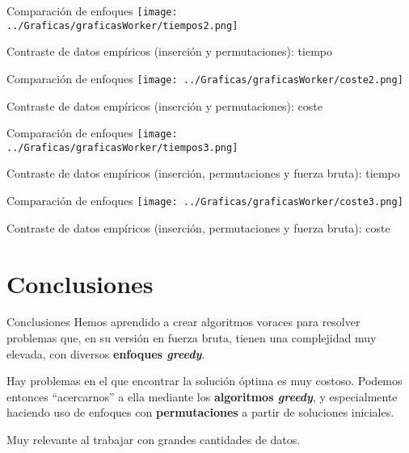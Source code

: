 \documentclass[10pt, xcolor=table]{beamer}
\begin{document}
\begin{frame}[fragile]{Comparación de enfoques}
\texttt{[image: ../Graficas/graficasWorker/tiempos2.png]}
\begin{center}
	\footnotesize{Contraste de datos empíricos (inserción y permutaciones): tiempo}
\end{center}
\end{frame}


\begin{frame}[fragile]{Comparación de enfoques}
\texttt{[image: ../Graficas/graficasWorker/coste2.png]}
\begin{center}
	\footnotesize{Contraste de datos empíricos (inserción y permutaciones): coste}
\end{center}
\end{frame}

\begin{frame}[fragile]{Comparación de enfoques}
\texttt{[image: ../Graficas/graficasWorker/tiempos3.png]}
\begin{center}
	\footnotesize{Contraste de datos empíricos (inserción, permutaciones y fuerza bruta): tiempo}
\end{center}
\end{frame}

\begin{frame}[fragile]{Comparación de enfoques}
\texttt{[image: ../Graficas/graficasWorker/coste3.png]}
\begin{center}
	\footnotesize{Contraste de datos empíricos (inserción, permutaciones y fuerza bruta): coste}
\end{center}
\end{frame}

\section{Conclusiones}

\begin{frame}{Conclusiones}
Hemos aprendido a crear algoritmos voraces para resolver problemas que, en su versión en fuerza bruta, tienen una complejidad muy elevada, con diversos \textbf{enfoques \emph{greedy}}.

Hay problemas en el que encontrar la solución óptima es muy costoso. Podemos entonces ``acercarnos'' a ella mediante los \textbf{algoritmos \emph{greedy}}, y especialmente haciendo uso de enfoques con \textbf{permutaciones} a partir de soluciones iniciales.

Muy relevante al trabajar con grandes cantidades de datos.

\end{frame}
\end{document}
